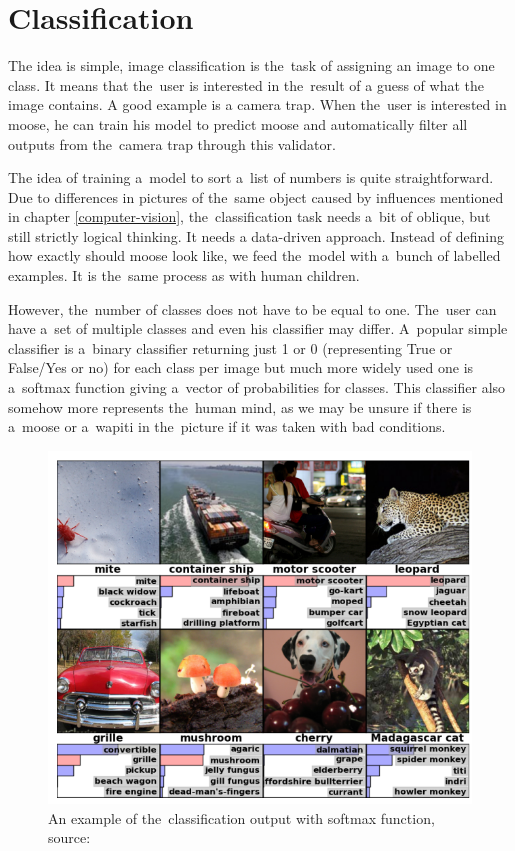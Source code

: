 \section{Classification}
\label{classification}

The idea is simple, image classification is the~task of assigning an image to 
one class. It means that the~user is interested in the~result of a guess of what 
the image contains. A good example is a camera trap. When the~user is interested 
in moose, he can train his model to predict moose and automatically filter all 
outputs from the~camera trap through this validator.

The idea of training a~model to sort a~list of numbers is quite 
straightforward. Due to differences in pictures of the~same object caused by 
influences mentioned in chapter \ref{computer-vision}, the~classification task 
needs a~bit of oblique, but still strictly logical thinking. It needs a 
data-driven approach. Instead of defining how exactly should moose look like, we 
feed the~model with a~bunch of labelled examples. It is the~same process as with 
human children.

However, the~number of classes does not have to be equal to one. The~user can 
have a~set of multiple classes and even his classifier may differ. A~popular 
simple classifier is a~binary classifier returning just 1 or 0 (representing 
True or False/Yes or no) for each class per image but much more widely used one 
is a~softmax function giving a~vector of probabilities for classes. This 
classifier also somehow more represents the~human mind, as we may be unsure if 
there is a~moose or a~wapiti in the~picture if it was taken with bad 
conditions.

\begin{figure}[H]
   \centering
	\includegraphics[width=.8\linewidth]{./pictures/classification.png}
	\caption[Classification example]{An example of the~classification output with 
softmax function, source: \cite{cnn-classification}}
      \label{fig:class}
\end{figure}

